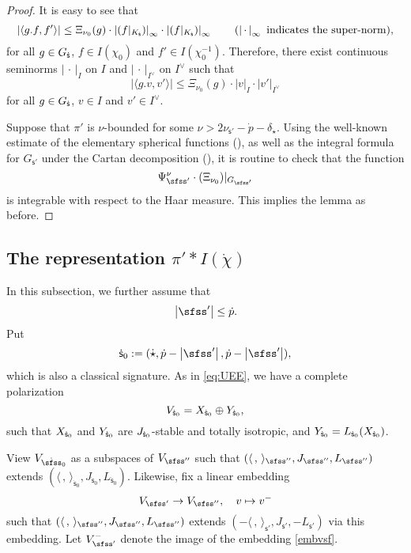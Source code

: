 \documentclass[12pt,a4paper]{amsart}
\def\abs#1{\left|{#1}\right|}
\newcommand{\la}{\langle}
\newcommand{\ra}{\rangle}
\newcommand{\be}{\begin {equation}}
\newcommand{\ee}{\end {equation}}
\numberwithin{equation}{section}
\theoremstyle{remark}
\begin{document}
\begin{proof}
 
 It is easy to see that
 \[
   \abs{\la g.f, f'\ra}\leq  \Xi_{\nu_0}(g)\cdot \abs{(f|_{K_\dsfss})}_\infty \cdot  \abs{(f|_{K_\dsfss})}_\infty \qquad(\abs{\,\cdot \,}_\infty \textrm{ indicates the super-norm}), 
 \]
 for all $g\in G_{\dot{\mathsf s}}$, $f\in I(\chi_0)$ and $f'\in I(\chi_0^{-1})$. Therefore, there exist continuous seminorms $\abs{\,\cdot\, }_I$ on $I$ and $\abs{\,\cdot\,}_{I^\vee}$ on $I^\vee$ such that
 \[
   \abs{\la g.v, v' \ra}\leq  \Xi_{\nu_0}(g)\cdot \abs{v}_I \cdot  \abs{v'}_{I^\vee}  
 \]
 for all $g\in G_{\dot{\mathsf s}}$, $v\in I$ and $v'\in I^\vee$. 
 
 Suppose that $\pi'$ is $\nu$-bounded for some 
$\nu>2\nu_{\mathsf s'}-\dot p-\delta_{\dot \star} $. 
Using the well-known estimate of the elementary spherical functions (\cite[Theorem 4.5.3 and Lemma 3.6.7]{Wa1}), as well as the integral formula for $G_{\mathsf s'}$ under the Cartan decomposition (\cite[Lemma 2.4.2]{Wa1}), it is routine to check that
the function
\[
  \Psi_{\sfss'}^\nu\cdot (\Xi_{\nu_0})|_{G_{\sfss'}}
\]
is integrable with respect to the Haar measure. This implies the lemma as before. 
\end{proof}

\subsection{The representation $\pi'* I(\dot{\chi})$} 

In this subsection, we further assume that 
\[
  \abs{\sfss'}\leq \dot p.
\]
Put 
\[
  \dot{ \mathsf s}_0:=(\dot \star, \dot p-\abs{\sfss'}, \dot p-\abs{\sfss'}),
\]
which is also a classical signature. As in \eqref{eq:UEE}, 
 we have a complete polarization
\begin{equation}\label{eq:UEE22}
  V_{{\dot{\mathsf s}}_0}=X_{{\dot{\mathsf s}}_0}\oplus Y_{{\dot{\mathsf s}}_0},  
\end{equation}
such that $X_{{\dot{\mathsf s}}_0}$ and $Y_{{\dot{\mathsf s}}_0}$ are $J_{{\dot{\mathsf s}}_0}$-stable and totally isotropic, and  $Y_{{\dot{\mathsf s}}_0}=L_{{\dot{\mathsf s}}_0}(X_{{\dot{\mathsf s}}_0})$.

View $V_{{\dot \sfss}_0}$  as a subspaces of $V_{\sfss''}$ such that $(\la\,,\,\ra_{\sfss''}, J_{\sfss''},L_{\sfss''})$  extends   $(\la\,,\,\ra_{\dot{ \mathsf s}_0}, J_{\dot{ \mathsf s}_0}, L_{\dot{ \mathsf s}_0})$. Likewise, 
 fix a linear embedding 
\be\label{embvsf}
  V_{\sfss'}\rightarrow V_{\sfss''}, \quad v\mapsto v^-
\ee
such that $(\la\,,\,\ra_{\sfss''}, J_{\sfss''},L_{\sfss''})$  extends  $(-\la\,,\,\ra_{\mathsf s'}, J_{\mathsf s'}, -L_{\mathsf s'})$ via this  embedding.
Let $V_{\sfss'}^-$ denote the image of the   embedding \eqref{embvsf}.  
 
\end{document}
